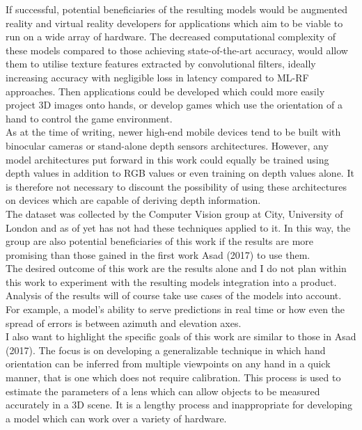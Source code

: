 \documentclass{article}
\begin{document}
If successful, potential beneficiaries of the resulting models would be augmented reality and virtual reality developers for applications which aim to be viable to run on a wide array of hardware. The decreased computational complexity of these models compared to those achieving state-of-the-art accuracy, would allow them to utilise texture features extracted by convolutional filters, ideally increasing accuracy with negligible loss in latency compared to ML-RF approaches. Then applications could be developed which could more easily project 3D images onto hands, or develop games which use the orientation of a hand to control the game environment.\\

As at the time of writing, newer high-end mobile devices tend to be built with binocular cameras or stand-alone depth sensors architectures. However, any model architectures put forward in this work could equally be trained using depth values in addition to RGB values or even training on depth values alone. It is therefore not necessary to discount the possibility of using these architectures on devices which are capable of deriving depth information. \\

The dataset was collected by the Computer Vision group at City, University of London and as of yet has not had these techniques applied to it. In this way, the group are also potential beneficiaries of this work if the results are more promising than those gained in the first work Asad (2017) to use them.\\

The desired outcome of this work are the results alone and I do not plan within this work to experiment with the resulting models integration into a product. Analysis of the results will of course take use cases of the models into account. For example, a model's ability to serve predictions in real time or how even the spread of errors is between azimuth and elevation axes.  \\

I also want to highlight the specific goals of this work are similar to those in Asad (2017). The focus is on developing a generalizable technique in which hand orientation can be inferred from multiple viewpoints on any hand in a quick manner, that is one which does not require calibration. This process is used to estimate the parameters of a lens which can allow objects to be measured accurately in a 3D scene. It is a lengthy process and inappropriate for developing a model which can work over a variety of hardware.\\
\end{document}
